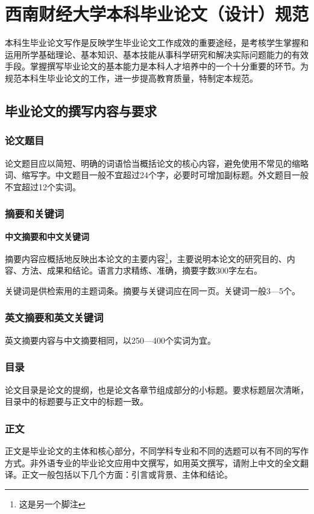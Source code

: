 \section{西南财经大学本科毕业论文（设计）规范}
本科生毕业论文写作是反映学生毕业论文工作成效的重要途经，是考核学生掌握和运用所学基础理论、基本知识、基本技能从事科学研究和解决实际问题能力的有效手段。掌握撰写毕业论文的基本能力是本科人才培养中的一个十分重要的环节。为规范本科生毕业论文的工作，进一步提高教育质量，特制定本规范。

\subsection{毕业论文的撰写内容与要求}
\subsubsection{论文题目}
论文题目应以简短、明确的词语恰当概括论文的核心内容，避免使用不常见的缩略词、缩写字。中文题目一般不宜超过24个字，必要时可增加副标题。外文题目一般不宜超过12个实词。
\subsubsection{摘要和关键词}
\textbf{中文摘要和中文关键词}

摘要内容应概括地反映出本论文的主要内容\footnote{这是另一个脚注}，主要说明本论文的研究目的、内容、方法、成果和结论。语言力求精练、准确，摘要字数300字左右。

关键词是供检索用的主题词条。摘要与关键词应在同一页。关键词一般3—5个。

\subsubsection{英文摘要和英文关键词}
英文摘要内容与中文摘要相同，以250—400个实词为宜。

\subsubsection{目录}
论文目录是论文的提纲，也是论文各章节组成部分的小标题。要求标题层次清晰，目录中的标题要与正文中的标题一致。

\subsubsection{正文}

正文是毕业论文的主体和核心部分，不同学科专业和不同的选题可以有不同的写作方式。非外语专业的毕业论文应用中文撰写，如用英文撰写，请附上中文的全文翻译。正文一般包括以下几个方面：引言或背景、主体和结论。

